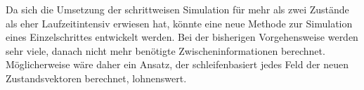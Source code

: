 Da sich die Umsetzung der schrittweisen Simulation für mehr als zwei Zustände als eher Laufzeitintensiv erwiesen hat, könnte eine neue Methode zur Simulation eines Einzelschrittes entwickelt werden. Bei der bisherigen Vorgehensweise werden sehr viele, danach nicht mehr benötigte Zwischeninformationen berechnet. Möglicherweise wäre daher ein Ansatz, der schleifenbasiert jedes Feld der neuen Zustandsvektoren berechnet, lohnenswert.

